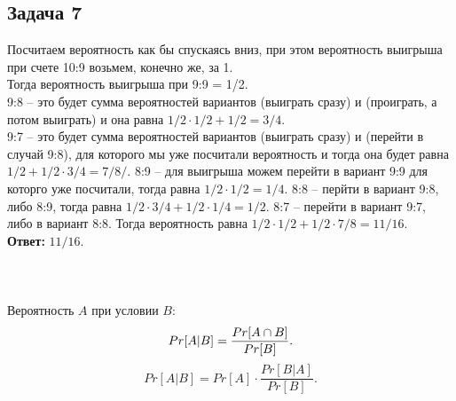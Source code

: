 	\subsection{Задача 7} 
	Посчитаем вероятность как бы спускаясь вниз, при этом вероятность выигрыша при счете 10:9 возьмем, конечно же, за 1. \\
	Тогда вероятность выигрыша при 9:9 = 1/2. \\
	9:8 -- это будет сумма вероятностей вариантов (выиграть сразу) и (проиграть, а потом выиграть) и она равна  $1/2 \cdot 1/2 + 1/2 = 3/4$. \\
	9:7 -- это будет сумма вероятностей вариантов (выиграть сразу) и (перейти в случай 9:8), для которого мы уже посчитали вероятность и тогда она будет равна $1/2 + 1/2 \cdot 3/4 = 7/8/$.
	8:9 -- для выигрыша можем перейти в вариант 9:9 для которго уже посчитали, тогда равна $1/2 \cdot 1/2 = 1/4$.
	8:8 -- перйти в вариант 9:8, либо 8:9, тогда равна $1/2 \cdot 3/4 + 1/2 \cdot 1/4 = 1/2$. 
	8:7 -- перейти в вариант 9:7, либо в вариант 8:8. Тогда вероятность равна $1/2 \cdot 1/2 + 1/2 \cdot 7/8 = 11/16$.\\
	\textbf{Ответ:} $11/16$.\\\\\\\\
	Вероятность $A$ при условии $B$:
	\[
		Pr[A|B] = \frac{Pr[A \cap B]}{Pr[B]}.\\
	\]
	\[
	Pr[A|B] = Pr[A] \cdot \frac{Pr[B|A]}{Pr[B]}.
	\]
	
		

